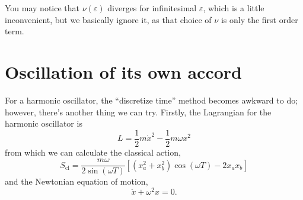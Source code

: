 \documentclass[]{revision-notes}
\begin{document}
You may notice that \( \nu(\varepsilon) \) diverges for infinitesimal \(\varepsilon \), which is a little inconvenient, but we basically ignore it, as that choice of \(\nu\) is only the first order term.

\section{Oscillation of its own accord}
For a harmonic oscillator, the ``discretize time'' method becomes awkward to do; however, there's another thing we can try.
Firstly, the Lagrangian for the harmonic oscillator is
\[ L = \frac{1}{2} m \dot{x}^2 - \frac{1}{2}m \omega x^2\] from which we can calculate the classical action,
\[ S_{\mathrm{cl}} = \frac{m\omega}{2\sin(\omega T)} [(x_a^2 + x_b^2)\cos(\omega T) - 2x_a x_b]\]
and the Newtonian equation of motion, \[ \ddot{x} + \omega^2 x = 0. \]
\end{document}
